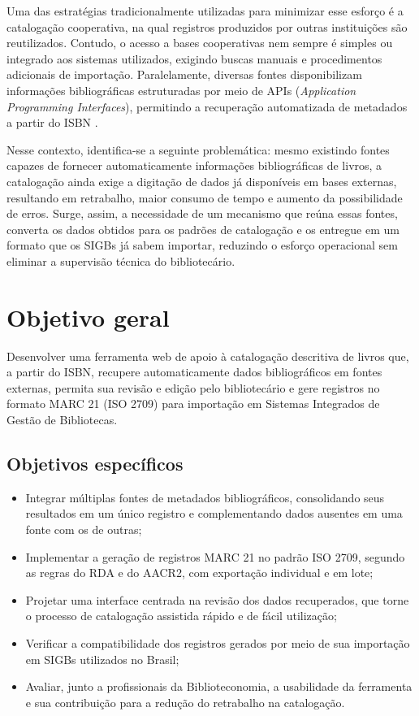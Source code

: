 Uma das estratégias tradicionalmente utilizadas para minimizar esse esforço é a catalogação cooperativa, na qual registros produzidos por outras instituições são reutilizados. Contudo, o acesso a bases cooperativas nem sempre é simples ou integrado aos sistemas utilizados, exigindo buscas manuais e procedimentos adicionais de importação. Paralelamente, diversas fontes disponibilizam informações bibliográficas estruturadas por meio de APIs (\textit{Application Programming Interfaces}), permitindo a recuperação automatizada de metadados a partir do ISBN \cite{isbn2017}.

Nesse contexto, identifica-se a seguinte problemática: mesmo existindo fontes capazes de fornecer automaticamente informações bibliográficas de livros, a catalogação ainda exige a digitação de dados já disponíveis em bases externas, resultando em retrabalho, maior consumo de tempo e aumento da possibilidade de erros. Surge, assim, a necessidade de um mecanismo que reúna essas fontes, converta os dados obtidos para os padrões de catalogação e os entregue em um formato que os SIGBs já sabem importar, reduzindo o esforço operacional sem eliminar a supervisão técnica do bibliotecário.

\section{Objetivo geral}
\label{sec:objetivo-geral}

Desenvolver uma ferramenta web de apoio à catalogação descritiva de livros que, a partir do ISBN, recupere automaticamente dados bibliográficos em fontes externas, permita sua revisão e edição pelo bibliotecário e gere registros no formato MARC 21 (ISO 2709) para importação em Sistemas Integrados de Gestão de Bibliotecas.

\subsection{Objetivos específicos}
\label{subsec:objetivos-especificos}

\begin{itemize}
    \item Integrar múltiplas fontes de metadados bibliográficos, consolidando seus resultados em um único registro e complementando dados ausentes em uma fonte com os de outras;
    \item Implementar a geração de registros MARC 21 no padrão ISO 2709, segundo as regras do RDA e do AACR2, com exportação individual e em lote;
    \item Projetar uma interface centrada na revisão dos dados recuperados, que torne o processo de catalogação assistida rápido e de fácil utilização;
    \item Verificar a compatibilidade dos registros gerados por meio de sua importação em SIGBs utilizados no Brasil;
    \item Avaliar, junto a profissionais da Biblioteconomia, a usabilidade da ferramenta e sua contribuição para a redução do retrabalho na catalogação.
\end{itemize}

